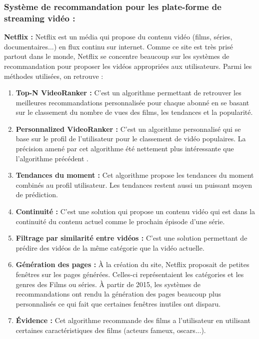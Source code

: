         \subsubsection*{Système de recommandation pour les plate-forme de streaming vidéo :}
        \textbf{Netflix :} Netflix est un média qui propose du contenu vidéo (films, séries, documentaires...) en flux continu sur internet. Comme ce site est très prisé partout dans le monde, Netflix se concentre beaucoup sur les systèmes de recommandation pour proposer les vidéos appropriées aux utilisateurs. Parmi les méthodes utilisées, on retrouve :
            \begin{enumerate}
                \item \textbf{Top-N VideoRanker :} C'est un algorithme permettant de retrouver les meilleures recommandations personnalisée pour chaque abonné en se basant sur le classement du nombre de vues des films, les tendances et la popularité.\\

                \item \textbf{Personnalized VideoRanker :} C'est un algorithme personnalisé qui se base sur le profil de l'utilisateur pour le classement de vidéo populaires. La précision amené par cet algorithme été nettement plus intéressante que l'algorithme précédent \cite{netflix} .\\

                \item \textbf{Tendances du moment :} Cet algorithme propose les tendances du moment combinés au profil utilisateur. Les tendances restent aussi un puissant moyen de prédiction.\\

                \item \textbf{Continuité :} C'est une solution qui propose un contenu vidéo qui est dans la continuité du contenu actuel comme le prochain épisode d'une série.\\

                \item \textbf{Filtrage par similarité entre vidéos :} C'est une solution permettant de prédire des vidéos de la même catégorie que la vidéo actuelle.\\

                \item \textbf{Génération des pages :} À la création du site, Netflix proposait de petites fenêtres sur les pages générées. Celles-ci représentaient les catégories et les genres des Films ou séries. À partir de 2015, les systèmes de recommandations ont rendu la génération des pages beaucoup plus personnalisés ce qui fait que certaines fenêtres inutiles ont disparu.\\

                \item \textbf{Évidence :} Cet algorithme recommande des films a l'utilisateur en utilisant certaines caractéristiques des films (acteurs fameux, oscars...).\cite{netflix}\\
            \end{enumerate}
